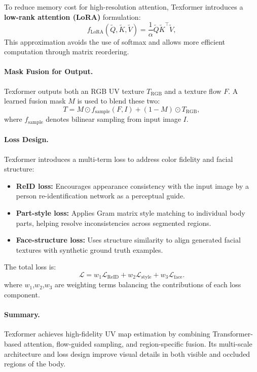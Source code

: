 To reduce memory cost for high-resolution attention, Texformer introduces a \textbf{low-rank attention (LoRA)} formulation:
\begin{equation}
f_{\mathrm{LoRA}}(\tilde{Q}, \tilde{K}, \tilde{V}) = \frac{1}{\alpha} \tilde{Q} \tilde{K}^{\top} \tilde{V},
\end{equation}
This approximation avoids the use of softmax and allows more efficient computation through matrix reordering.

\paragraph{Mask Fusion for Output.}
Texformer outputs both an RGB UV texture $T_{\mathrm{RGB}}$ and a texture flow $F$. A learned fusion mask $M$ is used to blend these two:
\begin{equation}
T = M \odot f_{\text{sample}}(F, I) + (1-M) \odot T_{\mathrm{RGB}},
\end{equation}
where $f_{\text{sample}}$ denotes bilinear sampling from input image $I$.

\paragraph{Loss Design.}
Texformer introduces a multi-term loss to address color fidelity and facial structure:
\begin{itemize}
    \item \textbf{ReID loss:} Encourages appearance consistency with the input image by a person re-identification network as a perceptual guide.
    \item \textbf{Part-style loss:} Applies Gram matrix style matching to individual body parts, helping resolve inconsistencies across segmented regions.
    \item \textbf{Face-structure loss:} Uses structure similarity to align generated facial textures with synthetic ground truth examples.
\end{itemize}
The total loss is:
\begin{equation}
\mathcal{L} = w_1 \mathcal{L}_{\mathrm{ReID}} + w_2 \mathcal{L}_{\mathrm{style}} + w_3 \mathcal{L}_{\mathrm{face}}.
\end{equation}
where $w_1$,$w_2$,$w_3$ are weighting terms balancing the contributions of each loss component.

\paragraph{Summary.}
Texformer achieves high-fidelity UV map estimation by combining Transformer-based attention, flow-guided sampling, and region-specific fusion. Its multi-scale architecture and loss design improve visual details in both visible and occluded regions of the body.

